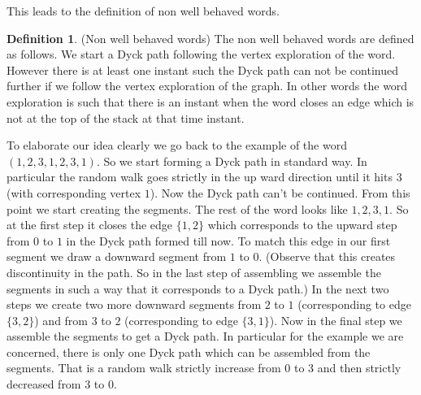 \documentclass[12pt]{article}
\numberwithin{equation}{section}
\numberwithin{equation}{section}
\theoremstyle{definition}
\newtheorem{definition}{Definition}[section]
\renewcommand{\1}{\bf 1}
\begin{document}
 This leads to the definition of non well behaved words. 
\begin{definition}(Non well behaved words)
The non well behaved words are defined as follows. We start a Dyck path following the vertex exploration of the word. However there is at least one instant such the Dyck path can not be continued further if we follow the vertex exploration of the graph. In other words the word exploration is such that there is an instant when the word closes an edge which is not at the top of the stack at that time instant. 
\end{definition} 
To elaborate our idea clearly we go back to the example of the word $(1,2,3,1,2,3,1)$. So we start forming a Dyck path in standard way. In particular the random walk goes strictly in the up ward direction until it hits $3$(with corresponding vertex $1$). Now the Dyck path can't be continued. From this point we start creating the segments. The rest of the word looks like $1,2,3,1$. So at the first step it closes the edge $\{ 1,2 \}$ which corresponds to the upward step from $0$ to $1$ in the Dyck path formed till now. To match this edge in our first segment we draw a downward segment from $1$ to $0$. (Observe that this creates discontinuity in the path. So in the last step of assembling we assemble the segments in such a way that it corresponds to a Dyck path.) In the next two steps we create two more downward segments from $2$ to $1$ (corresponding to edge $\{ 3,2 \}$) and from $3$ to $2$ (corresponding to edge $\{ 3,1 \}$). Now in the final step we 
assemble the segments to get a Dyck path. In particular for the example we are concerned, there is only one Dyck path which can be assembled from the segments. That is a random walk strictly increase from $0$ to $3$ and then strictly decreased from $3$ to $0$. %
\end{document}
